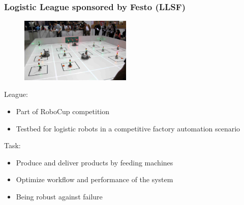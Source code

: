 \documentclass[]{beamer}
\begin{document}
\begin{frame}
  \frametitle{Logistic League sponsored by Festo (LLSF)}
  \fboxsep=0pt
  \noindent
  \begin{minipage}[]{0.48\linewidth}
    \begin{figure}
      \includegraphics[width=150pt,heigth=120pt]{../pics/llsfLeague.png}\\
    \end{figure}
  \end{minipage}
  \hfill
  \begin{minipage}[]{0.48\linewidth}
    League:
    \begin{itemize}
    \item Part of RoboCup competition
    \item Testbed for logistic robots in a competitive factory automation scenario
    \end{itemize}
    \pause
    Task:
    \begin{itemize}
    \item Produce and deliver products by feeding machines%
    \item Optimize workflow and performance of the system
    \item Being robust against failure
    \end{itemize}
  \end{minipage}
\end{frame}
\end{document}
